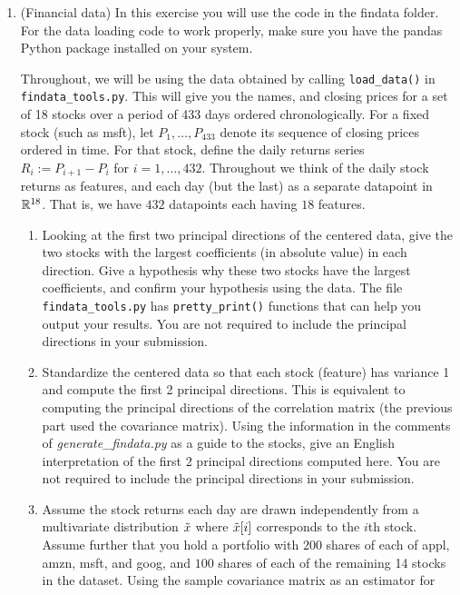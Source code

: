 \documentclass[12pt,twoside]{article}
\begin{document}
\begin{enumerate}
\begin{enumerate}
\end{enumerate}
\newpage
\item (Financial data) In this exercise you will use the code in the findata folder.
  For the data loading code to work properly, make sure you
  have the pandas Python package installed on your system.

  Throughout, we will be using the data obtained by calling
 \verb|load_data()| in \verb|findata_tools.py|.  This will
  give you the names, and closing prices for a set of 18 stocks over a
  period of 433 days ordered chronologically.
  For a fixed stock (such as msft), let
  $P_1,\ldots,P_{433}$ denote its sequence of closing prices ordered in
  time.  For that stock, define the daily returns series $R_i:=P_{i+1}-P_i$ for
  $i=1,\ldots,432$.  Throughout we think of the daily stock returns as features,
  and each day (but the last) as a separate datapoint in $\mathbb{R}^{18}$.
  That is, we have $432$ datapoints each having $18$ features.
  \begin{enumerate}
  \item Looking at the first two principal directions of the
    centered data, give the two stocks with the largest
    coefficients (in absolute value) in each direction.  
    Give a hypothesis why these two stocks have the largest
    coefficients, and confirm your hypothesis using the data.  The file 
 \verb|findata_tools.py| has \verb|pretty_print()|
    functions that can help you output your results.
    You are not required to include the principal directions in
    your submission.
  \item Standardize the centered data so that each stock (feature) has
    variance 1 and compute the first 2 principal directions.  This is
    equivalent to computing the principal directions of the
    correlation matrix (the previous part used the covariance
    matrix).  Using the information in the comments of
   \emph{generate\_findata.py} as a guide to the stocks, 
    give an English interpretation of the first 2 principal directions
    computed here. 
    You are not required to include the principal directions in
    your submission.
  \item Assume the stock returns each day are drawn independently from a
    multivariate distribution $\tilde{  x }$ where
    $\tilde{  x }[i]$ corresponds to the $i$th stock.  Assume further that
    you hold a portfolio with $200$ shares of each of appl, amzn, msft, and
    goog, and $100$ shares of each of the remaining 14 stocks in the
    dataset.  Using the sample covariance matrix as an estimator for

\end{enumerate}
\end{enumerate}
\end{document}
